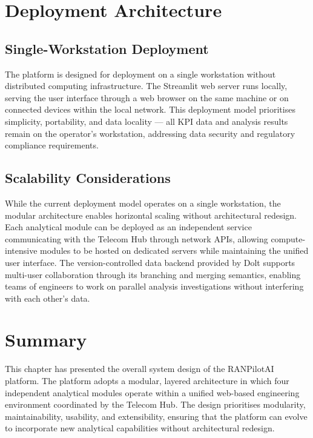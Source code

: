 \section{Deployment Architecture}

\subsection{Single-Workstation Deployment}

The platform is designed for deployment on a single workstation without distributed computing infrastructure. The Streamlit web server runs locally, serving the user interface through a web browser on the same machine or on connected devices within the local network. This deployment model prioritises simplicity, portability, and data locality — all KPI data and analysis results remain on the operator's workstation, addressing data security and regulatory compliance requirements.

\subsection{Scalability Considerations}

While the current deployment model operates on a single workstation, the modular architecture enables horizontal scaling without architectural redesign. Each analytical module can be deployed as an independent service communicating with the Telecom Hub through network APIs, allowing compute-intensive modules to be hosted on dedicated servers while maintaining the unified user interface. The version-controlled data backend provided by Dolt supports multi-user collaboration through its branching and merging semantics, enabling teams of engineers to work on parallel analysis investigations without interfering with each other's data.

\section{Summary}

This chapter has presented the overall system design of the RANPilotAI platform. The platform adopts a modular, layered architecture in which four independent analytical modules operate within a unified web-based engineering environment coordinated by the Telecom Hub. The design prioritises modularity, maintainability, usability, and extensibility, ensuring that the platform can evolve to incorporate new analytical capabilities without architectural redesign.

